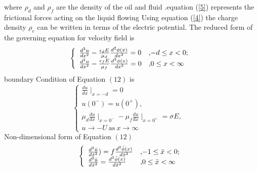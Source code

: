 \documentclass[11 pt]{article}
\begin{document}
where  $\rho_{d}$ and $\rho_{f}$ are  the density of the oil and  fluid .equation (\ref{5}) represents the frictional forces acting on the liquid flowing Using   equation  (\ref{4}) the  charge density $\rho_e$ can be written in terms of the electric potential. The reduced form of the governing equation for  velocity  field is
\begin{equation}
 \left\{
\begin{array}{ll}
\frac{d^{2} u}{d x^{2}}-\frac{\epsilon_{d}E}{\mu_{d}}\frac{d^{2} \phi(x)}{d x^{2}}=0  & \hbox{,$-d \le x <0$;} \\
\frac{d^{2} u}{d x^{2}}-\frac{\epsilon_{f}E}{\mu_{f}}\frac{d^{2} \phi(x)}{d x^{2}}=0  & \hbox{,$0 \le x <\infty$} \\


\end{array}
\right.
\label{12}
\end{equation}
boundary Condition of Equation $(12)$ is
 \begin{equation}
  \left\{
   \begin{array}{ll}
   \frac{d u}{d x}\mid_{x=-d}=0         &\\
  u(0^{-})=u(0^{+}),&\\
  \mu_{d}\frac{d u}{d x}\mid_{x=0^{-}}-\mu_{f}\frac{d u}{d x}\mid_{x=0^{+}}=\sigma E,  &\\
  u \rightarrow -U  ~ \text{as} ~ x \rightarrow \infty
   \end{array}
  \right.
  \label{13}
\end{equation}
Non-dimensional form of Equation $(12)$
\begin{equation}
 \left\{
                                                                  \begin{array}{ll}
   \frac{d^{2}\bar u}{d\bar x^{2}})=f \frac{d^{2}\bar \phi(x)}{d\bar x^{2}}                 & \hbox{,$-1 \le\bar x <0$;} \\

   \frac{d^{2}\bar u}{d\bar x^{2}}= \frac{d^{2}\bar \phi(x)}{d\bar x^{2}}                             & \hbox{,$0 \le \bar x <\infty$} \\
                                                                  \end{array}
                                                                 \right.
                                                               \label{14}
\end{equation}
\end{document}
